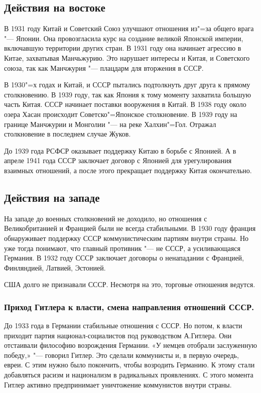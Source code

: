 \subsection{Действия на востоке}

В 1931 году Китай и Советский Союз улучшают отношения из"=за общего врага "--- Японии. Она провозгласила курс на создание великой Японской империи, включавшую территории других стран. В 1931 году она начинает агрессию в Китае, захватывая Манчьжурию. Это нарушает интересы и Китая, и Советского союза, так как Манчжурия "--- плацдарм для вторжения в СССР. 

В 1930"=х годах и Китай, и СССР пытались подтолкнуть друг друга к прямому столкновению. В 1939 году, так как Япония к тому моменту захватила большую часть Китая. СССР начинает поставки вооружения в Китай. В 1938 году около озера Хасан происходит Советско"=Японское столкновение. В 1939 году на границе Манчжурии и Монголии "--- на реке Халхин"=Гол. Отражал столкновение в последнем случае Жуков.

До 1939 года РСФСР оказывает поддержку Китаю в борьбе с Японией. А в апреле 1941 года СССР заключает договор с Японией для урегулирования взаимных отношений, а после этого прекращает поддержку Китая окончательно.

\subsection{Действия на западе}

На западе до военных столкновений не доходило, но отношения с Великобританией и Францией были не всегда стабильными. В 1930 году франция обнаруживает поддержку СССР коммунистическим партиям внутри страны. Но уже тогда понимают, что главный противник "--- не СССР, а усиливающаяся Германия. В 1932 году СССР заключает договоры о ненападании с Францией, Финляндией, Латвией, Эстонией.

США долго не признавали СССР. Несмотря на это, торговые отношения ведутся.

\subsubsection{\textbf{Приход Гитлера к власти, смена направления отношений СССР.}}

До 1933 года в Германии стабильные отношения с СССР. Но потом, к власти приходит партия национал-социалистов под руководством А.Гитлера. Они отстаивали философию возрождения Германии. «У немцев отобрали заслуженную победу,» "--- говорил Гитлер. Это сделали коммунисты и, в первую очередь, евреи. С этим нужно было покончить, чтобы возродить Германию. К этому стали добавляться расизм и национализм в радикальных проявлениях. С этого момента Гитлер активно предпринимает уничтожение коммунистов внутри страны. 

